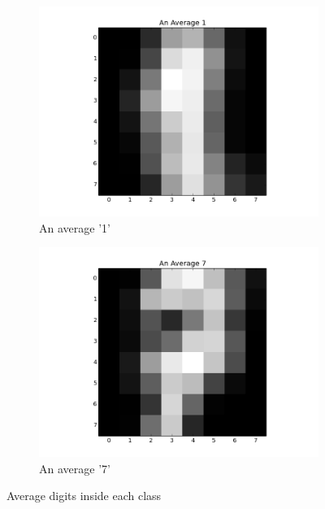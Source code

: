 \documentclass{article}
\begin{document}
\begin{figure}
        \centering
        \begin{subfigure}[b]{0.5\textwidth}
                \includegraphics[width=\textwidth]{../average1.png}
                \caption{An average '1'}
        \end{subfigure}%
        \begin{subfigure}[b]{0.5\textwidth}
                \includegraphics[width=\textwidth]{../average7.png}
                \caption{An average '7'}
        \end{subfigure}
        \caption{Average digits inside each class}\label{img1}
\end{figure}
\end{document}
